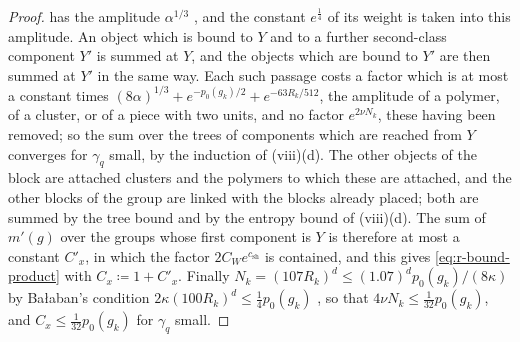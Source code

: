 \documentclass[11pt]{preprint}
\numberwithin{equation}{section}
\theoremstyle{definition}
\theoremstyle{remark}
\theoremstyle{plain}
\begin{document}
\begin{proof}
has the amplitude $\alpha^{1/3}$ \cite[p.~389]{BalabanLFR2}, and the constant $e^{\frac14}$ of its weight is taken into this amplitude. An object which is bound to $Y$ and to a further second-class component $Y'$ is summed at $Y$, and the objects which are bound to $Y'$ are then summed at $Y'$ in the same way. Each such passage costs a factor which is at most a constant times $(8\alpha)^{1/3} + e^{-p_0(g_k)/2} + e^{-63R_k/512}$, the amplitude of a polymer, of a cluster, or of a piece with two units, and no factor $e^{2\nu N_k}$, these having been removed; so the sum over the trees of components which are reached from $Y$ converges for $\gamma_q$ small, by the induction of (viii)(d). The other objects of the block are attached clusters and the polymers to which these are attached, and the other blocks of the group are linked with the blocks already placed; both are summed by the tree bound and by the entropy bound of (viii)(d). The sum of $m'(g)$ over the groups whose first component is $Y$ is therefore at most a constant $C'_x$, in which the factor $2C_We^{c_{\mathrm{sh}}}$ is contained, and this gives \eqref{eq:r-bound-product} with $C_x \coloneqq 1 + C'_x$. Finally $N_k = (107R_k)^d \leq (1.07)^dp_0(g_k)/(8\kappa)$ by Ba{\l}aban's condition $2\kappa(100R_k)^d \leq \frac14p_0(g_k)$ \cite[p.~389]{BalabanLFR2}, so that $4\nu N_k \leq \frac{1}{32}p_0(g_k)$, and $C_x \leq \frac{1}{32}p_0(g_k)$ for $\gamma_q$ small.


\end{proof}
\end{document}

